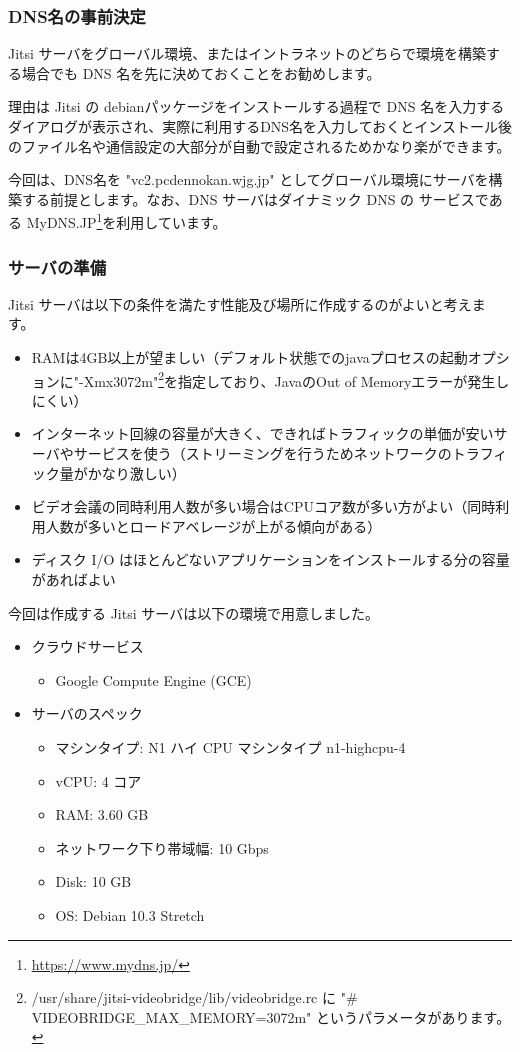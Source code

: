 \documentclass[mingoth,a4paper]{jsarticle}
\begin{document}
\subsubsection{DNS名の事前決定}

Jitsi サーバをグローバル環境、またはイントラネットのどちらで環境を構築する場合でも DNS 名を先に決めておくことをお勧めします。

理由は Jitsi の debianパッケージをインストールする過程で DNS 名を入力するダイアログが表示され、実際に利用するDNS名を入力しておくとインストール後のファイル名や通信設定の大部分が自動で設定されるためかなり楽ができます。

今回は、DNS名を "vc2.pcdennokan.wjg.jp" としてグローバル環境にサーバを構築する前提とします。なお、DNS サーバはダイナミック DNS の サービスである MyDNS.JP\footnote{\url{https://www.mydns.jp/}}を利用しています。


\subsubsection{サーバの準備}

Jitsi サーバは以下の条件を満たす性能及び場所に作成するのがよいと考えます。

\begin{itemize}
\item RAMは4GB以上が望ましい（デフォルト状態でのjavaプロセスの起動オプションに"-Xmx3072m"\footnote{/usr/share/jitsi-videobridge/lib/videobridge.rc に "\# VIDEOBRIDGE\_MAX\_MEMORY=3072m" というパラメータがあります。}を指定しており、JavaのOut of Memoryエラーが発生しにくい）
\item インターネット回線の容量が大きく、できればトラフィックの単価が安いサーバやサービスを使う（ストリーミングを行うためネットワークのトラフィック量がかなり激しい）
\item ビデオ会議の同時利用人数が多い場合はCPUコア数が多い方がよい（同時利用人数が多いとロードアベレージが上がる傾向がある）
\item ディスク I/O はほとんどないアプリケーションをインストールする分の容量があればよい
\end{itemize}

今回は作成する Jitsi サーバは以下の環境で用意しました。

\begin{itemize}
\item クラウドサービス
  \begin{itemize}
  \item Google Compute Engine (GCE)
  \end{itemize}
\item サーバのスペック
  \begin{itemize}
  \item マシンタイプ: N1 ハイ CPU マシンタイプ n1-highcpu-4
  \item vCPU: 4 コア
  \item RAM: 3.60 GB
  \item ネットワーク下り帯域幅: 10 Gbps
  \item Disk: 10 GB
  \item OS: Debian 10.3 Stretch
  \end{itemize}
\end{itemize}
\end{document}
